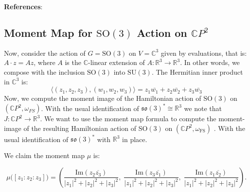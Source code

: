 \noindent \textbf{References}: \textcite{Wildberger1992}

\subsection{Moment Map for $\mathrm{SO}(3)$ Action on $\mathbb{C}P^2$}
Now, consider the action of $G = \mathrm{SO}(3)$ on $V = \mathbb{C}^{3}$ given by evaluations, that is: $A \cdot z = Az$, where $A$ is the $\mathbb{C}$-linear extension of $A: \mathbb{R}^{3} \to \mathbb{R}^{3}$. In other words, we compose with the inclusion $\mathrm{SO}(3)$ into $\mathrm{SU}(3)$. The Hermitian inner product in $\mathbb{C}^{3}$ is:
\begin{equation}
\langle (z_{1}, z_{2}, z_{3}), (w_{1}, w_{2}, w_{3}) \rangle = z_{1} \overline{w_{1}} + z_{2} \overline{w_{2}} + z_{3} \overline{w_{3}}
\end{equation}
Now, we compute the moment image of the Hamiltonian action of $\mathrm{SO}(3)$ on $(\mathbb{C}P^{2}, \omega_{FS})$. With the usual identification of $\mathfrak{so}(3)^{*} \cong \mathbb{R}^{3}$ we note that $J: \mathbb{C}P^{2} \to \mathbb{R}^{3}$.
We want to use the moment map formula to compute the moment-image of the resulting Hamiltonian action 
of $\mathrm{SO}(3)$ on $(\mathbb{C}P^2,\omega_{\mathrm{FS}})$ \textcite{Wildberger1992}. 
With the usual identification of $\mathfrak{so}(3)^*$ with $\mathbb{R}^3$ in place.

\begin{lemma}
We claim the moment map $\mu$ is:

\begin{equation}
\mu \bigl([z_1 : z_2 : z_3]\bigr) = 
\left(
\frac{\mathrm{Im}(z_2 \overline{z_3})}{|z_1|^2 + |z_2|^2 + |z_3|^2},\;
\frac{\mathrm{Im}(z_3 \overline{z_1})}{|z_1|^2 + |z_2|^2 + |z_3|^2},\;
\frac{\mathrm{Im}(z_1 \overline{z_2})}{|z_1|^2 + |z_2|^2 + |z_3|^2}
\right).
\end{equation}
    
\end{lemma}

